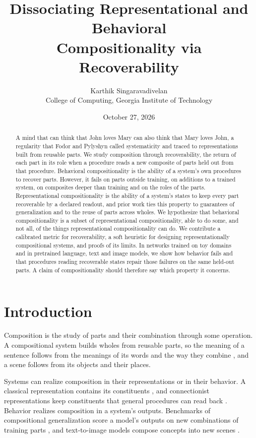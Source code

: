 \documentclass[10pt]{article}
\title{Dissociating Representational and Behavioral\\ Compositionality via Recoverability}
\author{Karthik Singaravadivelan\\ College of Computing, Georgia Institute of Technology}
\date{October 27, 2026}
\theoremstyle{plain}
\theoremstyle{remark}
\begin{document}
\maketitle

\begin{abstract}
A mind that can think that John loves Mary can also think that Mary loves John, a regularity that Fodor and Pylyshyn called systematicity and traced to representations built from reusable parts. We study composition through recoverability, the return of each part in its role when a procedure reads a new composite of parts held out from that procedure. Behavioral compositionality is the ability of a system's own procedures to recover parts. However, it fails on parts outside training, on additions to a trained system, on composites deeper than training and on the roles of the parts. Representational compositionality is the ability of a system's states to keep every part recoverable by a declared readout, and prior work ties this property to guarantees of generalization and to the reuse of parts across wholes. We hypothesize that behavioral compositionality is a subset of representational compositionality, able to do some, and not all, of the things representational compositionality can do. We contribute a calibrated metric for recoverability, a soft heuristic for designing representationally compositional systems, and proofs of its limits. In networks trained on toy domains and in pretrained language, text and image models, we show how behavior fails and that procedures reading recoverable states repair those failures on the same held-out parts. A claim of compositionality should therefore say which property it concerns.
\end{abstract}

\section{Introduction}
\label{sec:intro}

Composition is the study of parts and their combination through some operation. A compositional system builds wholes from reusable parts, so the meaning of a sentence follows from the meanings of its words and the way they combine \citep{frege1923,janssen1997}, and a scene follows from its objects and their places.

Systems can realize composition in their representations or in their behavior. A classical representation contains its constituents \citep{fodor1988}, and connectionist representations keep constituents that general procedures can read back \citep{hinton1990,smolensky1990,vangelder1990}. Behavior realizes composition in a system's outputs. Benchmarks of compositional generalization score a model's outputs on new combinations of training parts \citep{lake2018,keysers2020,kim2020cogs,hupkes2020,baroni2020}, and text-to-image models compose concepts into new scenes \citep{ramesh2021,liu2022composable,okawa2023}.
\end{document}
